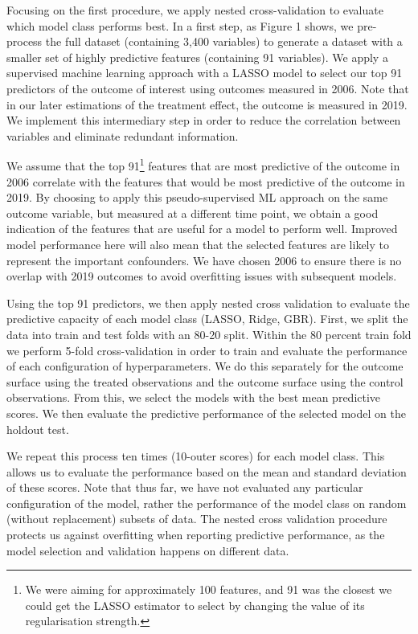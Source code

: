 \documentclass[12pt, a4paper]{article}
\begin{document}
Focusing on the first procedure, we apply nested cross-validation to evaluate
which model class performs best. In a first step, as Figure 1 shows, we
pre-process the full dataset (containing 3,400 variables) to generate a dataset
with a smaller set of highly predictive features (containing 91 variables). We
apply a supervised machine learning approach with a LASSO model to select our
top 91 predictors of the outcome of interest using outcomes measured in 2006.
Note that in our later estimations of the treatment effect, the outcome is
measured in 2019. We implement this intermediary step in order to reduce the
correlation between variables and eliminate redundant information.

We assume that the top 91\footnote{We were aiming for approximately 100
features, and 91 was the closest we could get the LASSO estimator to select by
changing the value of its regularisation strength.} features that are most
predictive of the outcome in 2006 correlate with the features that would be
most predictive of the outcome in 2019. By choosing to apply this
pseudo-supervised ML approach on the same outcome variable, but measured at a
different time point, we obtain a good indication of the features that are
useful for a model to perform well. Improved model performance here will also
mean that the selected features are likely to represent the important
confounders. We have chosen 2006 to ensure there is no overlap with 2019
outcomes to avoid overfitting issues with subsequent models.

Using the top 91 predictors, we then apply nested cross validation to evaluate
the predictive capacity of each model class (LASSO, Ridge, GBR). First, we
split the data into train and test folds with an 80-20 split. Within the 80
percent train fold we perform 5-fold cross-validation in order to train and
evaluate the performance of each configuration of hyperparameters. We do this
separately for the outcome surface using the treated observations and the
outcome surface using the control observations. From this, we select the models
with the best mean predictive scores. We then evaluate the predictive
performance of the selected model on the holdout test.

We repeat this process ten times (10-outer scores) for each model class. This
allows us to evaluate the performance based on the mean and standard deviation
of these scores. Note that thus far, we have not evaluated any particular
configuration of the model, rather the performance of the model class on random
(without replacement) subsets of data. The nested cross validation procedure
protects us against overfitting when reporting predictive performance, as the
model selection and validation happens on different data.
\end{document}
